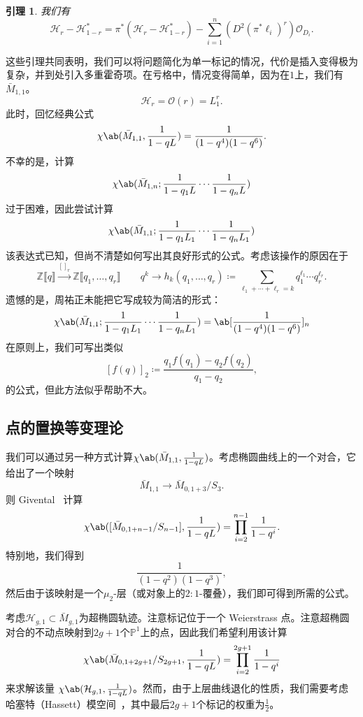 \documentclass{amsart}
\newtheorem{lem}[thm]{引理}
\theoremstyle{definition}
\theoremstyle{remark}
\theoremstyle{plain}
\theoremstyle{definition}
\theoremstyle{remark}
\newcommand{\Z}{\mathbb{Z}}
\renewcommand{\P}{\mathbb{P}}
\newcommand{\mc}[1]{\mathcal{#1}}
\newcommand{\1}{\mathbf{1}}
\newcommand{\2}{\mathbf{2}}
\newcommand{\3}{\mathbf{3}}
\newcommand{\ps}[1]{\llbracket #1 \rrbracket}
\begin{document}
\begin{lem}
我们有
    \[ \mc{H}_r - \mc{H}_{1-r}^* = \pi^* (\mc{H}_r - \mc{H}_{1-r}^*) - \sum_{i=1}^n (D^2 (\pi^* \ell_i)^r) \mc{O}_{D_i}. \]
\end{lem}

这些引理共同表明，我们可以将问题简化为单一标记的情况，代价是插入变得极为复杂，并到处引入多重霍奇项。在亏格中，情况变得简单，因为在\(1\)上，我们有\(\bar{M}_{1,1}\)。
\[ \mc{H}_r = \mc{O}(r) = L_1^r. \]
此时，回忆经典公式
\[ \chi\ab(\bar{M}_{1,1}, \frac{1}{1-qL}) = \frac{1}{(1-q^4)(1-q^6)}. \]
不幸的是，计算
\[ \chi\ab(\bar{M}_{1,n}; \frac{1}{1-q_1 L} \cdots \frac{1}{1-q_n L}) \]
过于困难，因此尝试计算
\[ \chi\ab(\bar{M}_{1,1}; \frac{1}{1-q_1 L_1} \cdots \frac{1}{1-q_n L_1})  \]
该表达式已知，但尚不清楚如何写出其良好形式的公式。考虑该操作的原因在于
\[ \Z\ps{q} \xrightarrow{[]_r} \Z\ps{q_1, \ldots, q_r} \qquad q^k \to h_k(q_1, \ldots, q_r) \coloneqq \sum_{\ell_1 + \cdots + \ell_r = k} q_1^{\ell_1} \cdots q_r^{\ell_r}. \]
遗憾的是，周祐正未能把它写成较为简洁的形式：
\[ \chi\ab(\bar{M}_{1,1}; \frac{1}{1-q_1 L_1} \cdots \frac{1}{1-q_n L_1}) = \ab[\frac{1}{(1-q^4)(1-q^6)}]_n \]
在原则上，我们可写出类似
\[ [f(q)]_2 \coloneqq \frac{q_1 f(q_1) - q_2 f(q_2)}{q_1 - q_2}, \]
的公式，但此方法似乎帮助不大。

\subsection{点的置换等变理论}%
\label{sub:Permutation-equivariant theory of a point}

我们可以通过另一种方式计算\(\chi\ab(\bar{M}_{1,1}, \frac{1}{1-q L})\)。考虑椭圆曲线上的一个对合，它给出了一个映射
\[ \bar{M}_{1,1} \to \bar{M}_{0,1+3}/S_3. \]
则 Givental~\cite{Givental2017K1} 计算
\[ \chi\ab([\bar{M}_{0,1+n-1}/S_{n-1}], \frac{1}{1-qL}) = \prod_{i=2}^{n-1} \frac{1}{1-q^i}. \]
特别地，我们得到
\[ \frac{1}{(1-q^2)(1-q^3)}, \]
然后由于该映射是一个\(\mu_2\)-层（或对象上的\(2:1\)-覆叠），我们即可得到所需的公式。

考虑\(\mc{H}_{g,1} \subset \bar{M}_{g,1}\)为超椭圆轨迹。注意标记位于一个 Weierstrass 点。注意超椭圆对合的不动点映射到\(2g+1\)个\(\P^1\)上的点，因此我们希望利用该计算
\[ \chi\ab(\bar{M}_{0,1+2g+1}/S_{2g+1}, \frac{1}{1-q L}) = \prod_{i=2}^{2g+1} \frac{1}{1-q^i} \]
来求解该量
\(\chi\ab(\mc{H}_{g,1}, \frac{1}{1-qL})\)。然而，由于上层曲线退化的性质，我们需要考虑哈塞特（Hassett）模空间~\cite{Hassett2003}，其中最后\(2g+1\)个标记的权重为\(\frac{1}{2}\)。
 
\end{document}
